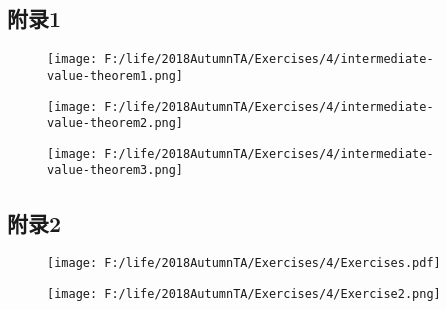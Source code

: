 \documentclass[12pt,UTF8]{ctexart}
\begin{document}
\subsection{附录1}
\begin{figure}[H]
\begin{center}
\texttt{[image: F:/life/2018AutumnTA/Exercises/4/intermediate-value-theorem1.png]}
\end{center}
\end{figure}
\begin{figure}[H]
\begin{center}
\texttt{[image: F:/life/2018AutumnTA/Exercises/4/intermediate-value-theorem2.png]}
\end{center}
\end{figure}
\begin{figure}[H]
\begin{center}
\texttt{[image: F:/life/2018AutumnTA/Exercises/4/intermediate-value-theorem3.png]}
\end{center}
\end{figure}
\subsection{附录2}
\begin{figure}[H]
\begin{center}
\texttt{[image: F:/life/2018AutumnTA/Exercises/4/Exercises.pdf]}
\end{center}
\end{figure}
\begin{figure}[H]
\begin{center}
\texttt{[image: F:/life/2018AutumnTA/Exercises/4/Exercise2.png]}
\end{center}
\end{figure}
\end{document}

